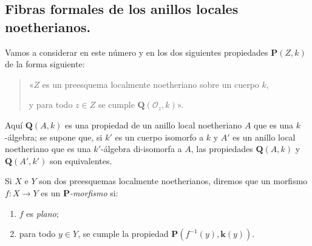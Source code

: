 \subsection{Fibras formales de los anillos locales noetherianos.}
\label{subsection:IV.7.3-fr}

\begin{env}[7.3.1]
\label{IV.2.s7.3.1-fr}
Vamos a considerar en este número y en los dos siguientes propiedades
$\boldsymbol P(Z,k)$ de la forma siguiente:
\begin{quote}
«$Z$ es un preesquema localmente noetheriano sobre un cuerpo $k$,

y para todo $z\in Z$ se cumple $\boldsymbol Q(\mathscr O_z,k)$».
\end{quote}
Aquí $\boldsymbol Q(A,k)$ es una propiedad de un anillo local
noetheriano $A$ que es una $k$-álgebra; se supone que, si $k'$ es un
cuerpo isomorfo a $k$ y $A'$ es un anillo local noetheriano que es una
$k'$-álgebra di-isomorfa a $A$, las propiedades $\boldsymbol Q(A,k)$
y $\boldsymbol Q(A',k')$ son equivalentes.
\end{env}


Si $X$ e $Y$ son dos preesquemas localmente noetherianos, diremos que
un morfismo $f:X\to Y$ es un \emph{$\boldsymbol P$-morfismo} si:
\begin{enumerate}
\item[1\textsuperscript{o}] $f$ es \emph{plano};
\item[2\textsuperscript{o}] para todo $y\in Y$, se cumple la propiedad
$\boldsymbol P(f^{-1}(y),\boldsymbol{k}(y))$.
\end{enumerate}
